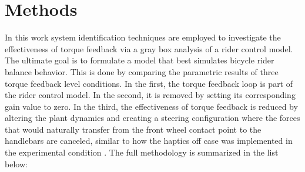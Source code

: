 \section{Methods}
  In this work system identification techniques are employed to investigate the effectiveness of torque feedback via a gray box analysis of a rider control model. The ultimate goal is to formulate a model that best simulates bicycle rider balance behavior. This is done by comparing the parametric  results of  three torque feedback level conditions. In the first, the torque feedback loop is part of the rider control model. In the second, it is removed by setting its corresponding gain value to zero. In the third, the effectiveness of torque feedback is reduced by altering the plant dynamics and creating a steering configuration where the forces that would naturally transfer from the front wheel contact point to the handlebars are canceled, similar to how the haptics off case was implemented in the experimental condition \cite{dialynaseffect}. The full methodology is summarized in the list below:
